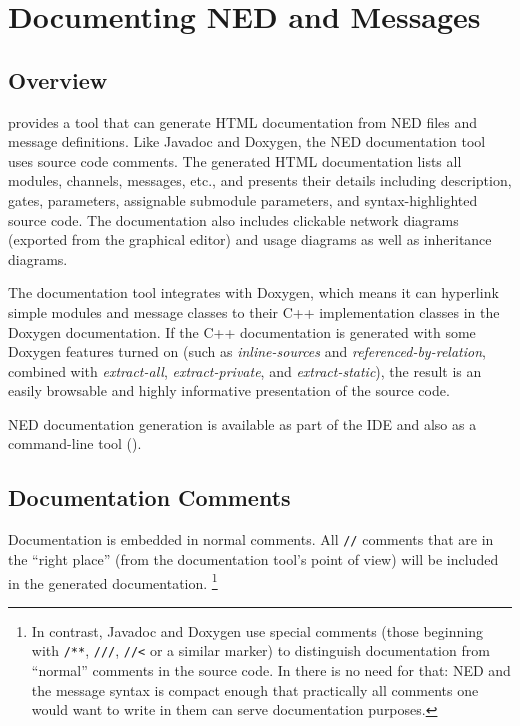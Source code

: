 \chapter{Documenting NED and Messages}
\label{cha:neddoc}

\section{Overview}
\label{sec:neddoc:overview}
{\opp} provides a tool that can generate HTML documentation from NED files
and message definitions. Like Javadoc and Doxygen, the NED documentation tool
uses source code comments. The generated HTML documentation
lists all modules, channels, messages, etc., and presents their details including
description, gates, parameters, assignable submodule parameters, and
syntax-highlighted source code. The documentation also includes clickable
network diagrams (exported from the graphical editor) and usage diagrams as
well as inheritance diagrams.

The documentation tool integrates with Doxygen, which means it can
hyperlink simple modules and message classes to their C++ implementation
classes in the Doxygen documentation. If the C++ documentation is generated
with some Doxygen features turned on (such as \textit{inline-sources} and
\textit{referenced-by-relation}, combined with \textit{extract-all},
\textit{extract-private}, and \textit{extract-static}), the result is an
easily browsable and highly informative presentation of the source code.

NED documentation generation is available as part of the {\opp} IDE and
also as a command-line tool ().


\section{Documentation Comments}
\label{sec:neddoc:documentation-comments}

Documentation is embedded in normal comments. All \texttt{//} comments
that are in the ``right place'' (from the documentation tool's
point of view) will be included in the generated documentation.
\footnote{In contrast, Javadoc and Doxygen use special comments (those
   beginning with \texttt{/**}, \texttt{///}, \texttt{//<} or a similar
   marker) to distinguish documentation from ``normal'' comments in the
   source code. In {\opp} there is no need for that: NED and the message
   syntax is compact enough that practically all comments one would want to write
   in them can serve documentation purposes.}

